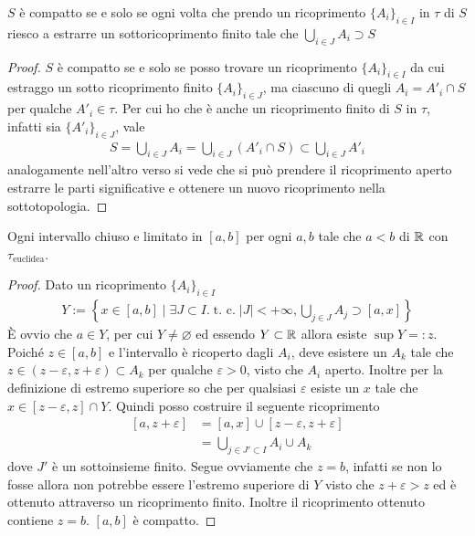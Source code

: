\begin{remark}
	$S$ è compatto se e solo se ogni volta che prendo un ricoprimento $\{A_i\}_{i \in I}$ in $\tau$ di $S$ riesco a estrarre un sottoricoprimento finito tale che $\bigcup_{i \in J} A_i \supset S$ 
	\begin{proof}
		$S$ è compatto se e solo se posso trovare un ricoprimento $\{A_i\}_{i \in I}$ da cui estraggo un sotto ricoprimento finito $\{A_i\}_{i \in J}$, ma ciascuno di quegli $A_i = A'_i \cap S$ per qualche $A'_i \in \tau$. Per cui ho che è anche un ricoprimento finito di $S$ in $\tau$, infatti sia $\{A'_i\}_{i\in J}$, vale 
		\begin{equation}
		\begin{aligned}
			S = \bigcup_{i \in J} A_i = \bigcup_{i \in J} (A'_i \cap S)  \subset  \bigcup_{i \in J} A'_i
		\end{aligned}
		\end{equation}
		analogamente nell'altro verso si vede che si può prendere il ricoprimento aperto estrarre le parti significative e ottenere un nuovo ricoprimento nella sottotopologia.
	\end{proof}
\end{remark}


\begin{theorem}
	Ogni intervallo chiuso e limitato in $\left[a, b\right]$ per ogni $a, b$ tale che $a < b$ di $\mathbb{R}$ con $\tau_{\text{euclidea}}$.
\end{theorem} 
\begin{proof}
	Dato un ricoprimento $\{A_i\}_{i \in I}$ 
	\begin{equation}
		\begin{aligned}
			Y := \left\{ x\in \left[a,b\right] \; | \; \exists J \subset I. \; \text{t. c.} \; |J| < +\infty, \bigcup_{j \in J} A_j \supset \left[a,x\right]\right\}
		\end{aligned}
	\end{equation}
	È ovvio che $a \in Y$, per cui $Y \neq \varnothing$ ed essendo $Y \subset \mathbb{R}$ allora esiste $\sup Y =: z$. Poiché $z \in \left[a,b\right]$ e l'intervallo è ricoperto dagli $A_i$, deve esistere un $A_{k}$ tale che $z \in (z-\varepsilon, z+\varepsilon) \subset A_k$ per qualche $\varepsilon > 0$, visto che $A_i$ aperto. Inoltre per la definizione di estremo superiore so che per qualsiasi $\varepsilon$ esiste un $x$ tale che $x \in \left[z-\varepsilon, z\right] \cap Y$. Quindi posso costruire il seguente ricoprimento
	\begin{equation}
	\begin{aligned}
		\left[a,z+\varepsilon\right] & = \left[a,x\right] \cup \left[z-\varepsilon, z+\varepsilon\right]\\
				& =  \bigcup_{j \in J' \subset I} A_i \cup A_k
	\end{aligned}
	\end{equation}
	dove $J'$ è un sottoinsieme finito. Segue ovviamente che $z = b$, infatti se non lo fosse allora non potrebbe essere l'estremo superiore di $Y$ visto che $z+\varepsilon > z$ ed è ottenuto attraverso un ricoprimento finito. Inoltre il ricoprimento ottenuto contiene $z = b$. $\left[a,b\right]$ è compatto.
\end{proof}

